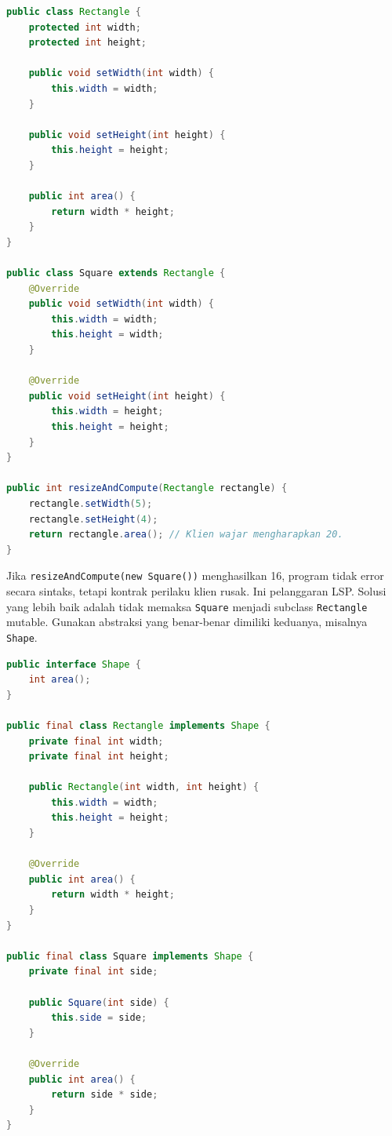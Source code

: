 \begin{lstlisting}[language=Java, caption={Pelanggaran LSP: Square tidak cocok menggantikan Rectangle mutable}, label={lst:lsp-bad}]
public class Rectangle {
    protected int width;
    protected int height;

    public void setWidth(int width) {
        this.width = width;
    }

    public void setHeight(int height) {
        this.height = height;
    }

    public int area() {
        return width * height;
    }
}

public class Square extends Rectangle {
    @Override
    public void setWidth(int width) {
        this.width = width;
        this.height = width;
    }

    @Override
    public void setHeight(int height) {
        this.width = height;
        this.height = height;
    }
}

public int resizeAndCompute(Rectangle rectangle) {
    rectangle.setWidth(5);
    rectangle.setHeight(4);
    return rectangle.area(); // Klien wajar mengharapkan 20.
}
\end{lstlisting}

Jika \texttt{resizeAndCompute(new Square())} menghasilkan 16, program tidak error secara sintaks, tetapi kontrak perilaku klien rusak. Ini pelanggaran LSP. Solusi yang lebih baik adalah tidak memaksa \texttt{Square} menjadi subclass \texttt{Rectangle} mutable. Gunakan abstraksi yang benar-benar dimiliki keduanya, misalnya \texttt{Shape}.

\begin{lstlisting}[language=Java, caption={Penerapan LSP: abstraksi perilaku yang aman}, label={lst:lsp-good}]
public interface Shape {
    int area();
}

public final class Rectangle implements Shape {
    private final int width;
    private final int height;

    public Rectangle(int width, int height) {
        this.width = width;
        this.height = height;
    }

    @Override
    public int area() {
        return width * height;
    }
}

public final class Square implements Shape {
    private final int side;

    public Square(int side) {
        this.side = side;
    }

    @Override
    public int area() {
        return side * side;
    }
}
\end{lstlisting}

